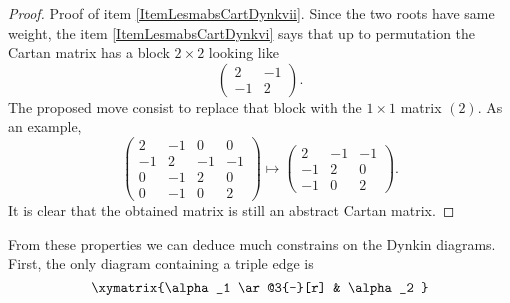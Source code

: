 \begin{proof}
    Proof of item \ref{ItemLesmabsCartDynkvii}. Since the two roots have same weight, the item \ref{ItemLesmabsCartDynkvi} says that up to permutation the Cartan matrix has a block \( 2\times 2\) looking like
    \begin{equation}
        \begin{pmatrix}
            2    &   -1    \\ 
            -1    &   2    
        \end{pmatrix}.
    \end{equation}
    The proposed move consist to replace that block with the \( 1\times 1\) matrix \( (2)\). As an example,
    \begin{equation}
        \begin{pmatrix}
             2   &   -1    &   0    &   0    \\
             -1   &   2    &   -1    &   -1    \\
             0   &   -1    &   2    &   0    \\ 
             0   &   -1    &   0    &   2     
         \end{pmatrix}\mapsto
         \begin{pmatrix}
             2   &   -1    &   -1    \\
             -1   &   2    &   0    \\
             -1   &   0    &   2
         \end{pmatrix}.
    \end{equation}
    It is clear that the obtained matrix is still an abstract Cartan matrix.
\end{proof}

From these properties we can deduce much constrains on the Dynkin diagrams. First, the only diagram containing a triple edge is
\begin{equation}
    \xymatrix{%
    \alpha_1 \ar@3{-}[r]        &   \alpha_2
       }
\end{equation}

